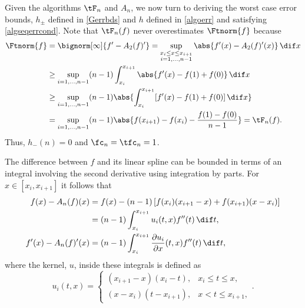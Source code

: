 Given the algorithms $\tF_n$ and $A_n$, we now turn to deriving the worst case error bounds, $h_{\pm}$ defined in \eqref{Gerrbds} and $h$ defined in \eqref{algoerr} and satisfying \eqref{algseqerrcond}.  
Note that $\tF_{n}(f)$ never overestimates $\Ftnorm{f}$ because 
\begin{align*}
\Ftnorm{f} &  = \bignorm[\infty]{f'-A_2(f)'} 
= \sup_{\substack{x_i \le x \le x_{i+1}\\ i=1, \ldots, n-1 }} \abs{f'(x) - A_2(f)'(x)} \, \dif x \\
&\ge \sup_{i=1, \ldots, n-1} (n-1)\int_{x_i}^{x_{i+1}} \abs{f'(x) - f(1)+f(0)} \, \dif x \\
&\ge \sup_{i=1, \ldots, n-1} (n-1)\abs{\int_{x_i}^{x_{i+1}} [f'(x) - f(1)+f(0)] \, \dif x }\\
&= \sup_{i=1, \ldots, n-1} (n-1)\abs{f(x_{i+1})-f(x_i) - \frac{f(1)-f(0)}{n-1}} = \tF_n(f).
\end{align*}
Thus, $h_{-}(n)=0$ and $\fc_n=\tfc_n=1$. 

The difference between $f$ and its linear spline can be bounded in terms of an integral involving the second derivative using integration by parts.  For $x \in [x_i,x_{i+1}]$ it follows that 
\begin{align}
\nonumber
f(x)-A_n (f)(x)
&= f(x) - (n-1) \left[f(x_{i})(x_{i+1}-x) +f(x_{i+1})(x-x_i) \right]\\
& = (n-1) \int_{x_i}^{x_{i+1}} u_i(t,x) f''(t) \, \dif t, \label{fintermsfdoubprime}\\
f'(x)-A_n(f)'(x) & = (n-1) \int_{x_i}^{x_{i+1}} \frac{\partial u_i}{\partial x}(t,x) f''(t) \, \dif t, \label{fprimeintermsfdoubprime}
\end{align}
where the kernel, $u$, inside these integrals is defined as
\begin{equation*}
u_i(t,x) =\begin{cases} (x_{i+1}-x)(x_i-t), & x_i\leq t\leq x,\\
(x-x_{i})(t- x_{i+1}), & x< t \leq x_{i+1},
\end{cases}.
\end{equation*}

